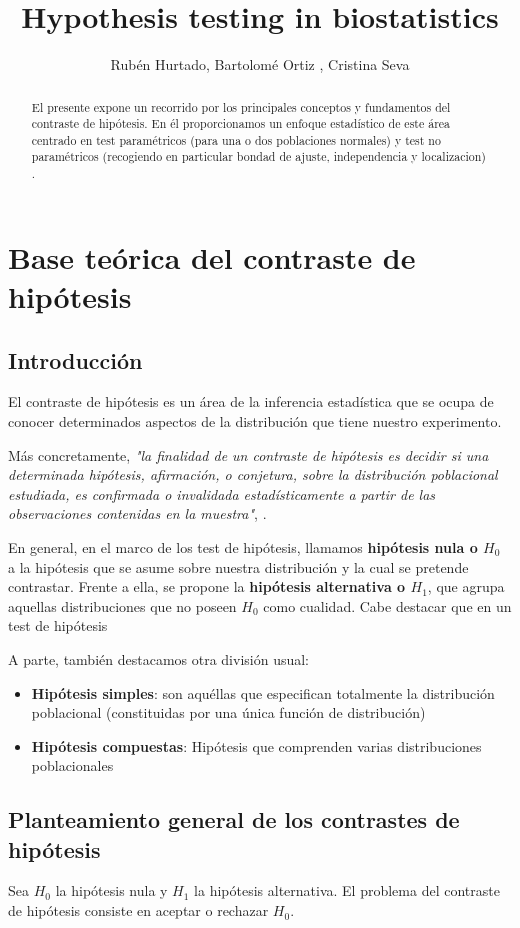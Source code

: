 \documentclass[a4paper,12pt]{article}
\title{Hypothesis testing in biostatistics}
\author{Rubén Hurtado, Bartolomé Ortiz , Cristina Seva }
\begin{document}
\maketitle

\begin{abstract}
El presente expone un recorrido por los principales conceptos y fundamentos del contraste de hipótesis. En él proporcionamos un enfoque estadístico de este área centrado en test paramétricos (para una o dos poblaciones normales) y test no paramétricos (recogiendo en particular bondad de ajuste, independencia y localizacion) . 
\end{abstract}


\section{Base teórica del contraste de hipótesis}
\subsection{Introducción}
El contraste de hipótesis es un área de la inferencia estadística que se ocupa de conocer determinados aspectos de la distribución que tiene nuestro experimento.

Más concretamente, \textit{"la finalidad de un contraste de hipótesis es decidir si una determinada hipótesis, afirmación, o conjetura, sobre la distribución poblacional estudiada, es confirmada o invalidada estadísticamente a partir de las observaciones contenidas en la muestra"}, \cite{velez1993principios}.

En general, en el marco de los test de hipótesis, llamamos \textbf{hipótesis nula o $H_0$} a la hipótesis que se asume sobre nuestra distribución y la cual se pretende contrastar.
Frente a ella, se propone la \textbf{hipótesis alternativa o $H_1$}, que agrupa aquellas distribuciones que no poseen $H_0$ como cualidad.
Cabe destacar que en un test de hipótesis 

A parte, también destacamos otra división usual:
\begin{itemize}
	\item \textbf{Hipótesis simples}: son aquéllas que especifican totalmente la distribución poblacional (constituidas por una única función de distribución)
	\item \textbf{Hipótesis compuestas}: Hipótesis  que comprenden varias distribuciones poblacionales 
\end{itemize}

\subsection{Planteamiento general de los contrastes de hipótesis}
Sea $H_0$ la hipótesis nula y $H_1$ la hipótesis alternativa. El problema del contraste de hipótesis consiste en aceptar o rechazar $H_0$.
\end{document}
